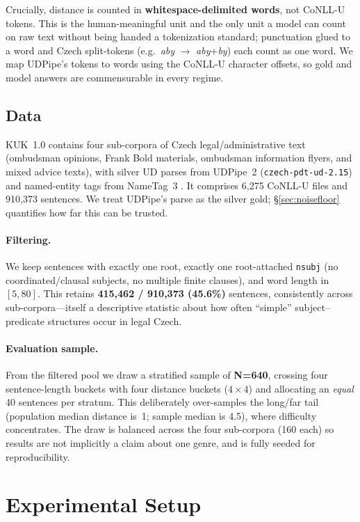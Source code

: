 \documentclass[11pt]{article}
\begin{document}
Crucially, distance is counted in \textbf{whitespace-delimited words}, not CoNLL-U tokens. This is
the human-meaningful unit and the only unit a model can count on raw text without being handed a
tokenization standard; punctuation glued to a word and Czech split-tokens (e.g.\ \emph{aby}
$\rightarrow$ \emph{aby}+\emph{by}) each count as one word. We map UDPipe's tokens to words using
the CoNLL-U character offsets, so gold and model answers are commensurable in every regime.

\subsection{Data}
KUK~1.0 \citep{hladka2024kuk} contains four sub-corpora of Czech legal/administrative text
(ombudsman opinions, Frank Bold materials, ombudsman information flyers, and mixed advice texts),
with silver UD parses from UDPipe~2 (\texttt{czech-pdt-ud-2.15}) and named-entity tags from NameTag~3
\citep{strakova2019nametag}. It comprises 6{,}275 CoNLL-U files and 910{,}373 sentences. We treat
UDPipe's parse as the silver gold; \S\ref{sec:noisefloor} quantifies how far this can be trusted.

\paragraph{Filtering.} We keep sentences with exactly one root, exactly one root-attached
\texttt{nsubj} (no coordinated/clausal subjects, no multiple finite clauses), and word length in
$[5,80]$. This retains \textbf{415{,}462 / 910{,}373 (45.6\%)} sentences, consistently across
sub-corpora---itself a descriptive statistic about how often ``simple'' subject--predicate
structures occur in legal Czech.

\paragraph{Evaluation sample.} From the filtered pool we draw a stratified sample of
\textbf{N=640}, crossing four sentence-length buckets with four distance buckets ($4\times4$) and
allocating an \emph{equal} 40 sentences per stratum. This deliberately over-samples the long/far
tail (population median distance is~1; sample median is 4.5), where difficulty concentrates. The
draw is balanced across the four sub-corpora (160 each) so results are not implicitly a claim about
one genre, and is fully seeded for reproducibility.

\section{Experimental Setup}
\end{document}
